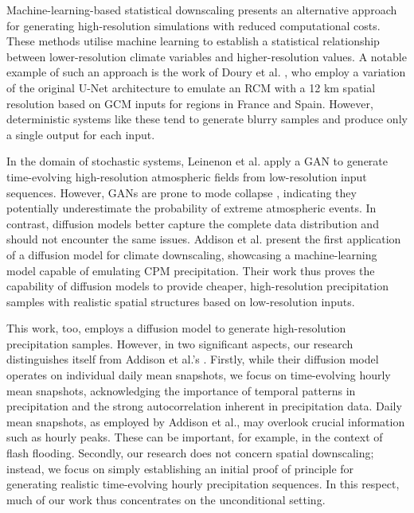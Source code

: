 \documentclass[ oneside,%
                    author={George Herbert},
                    degree={MSci},
                     title={Diffusion Models for Time-Evolving Precipitation Fields},
                  subtitle={}]{dissertation}
\begin{document}
Machine-learning-based statistical downscaling presents an alternative approach for generating high-resolution simulations with reduced computational costs. These methods utilise machine learning to establish a statistical relationship between lower-resolution climate variables and higher-resolution values. A notable example of such an approach is the work of Doury et al. \cite{Doury_Regional_Climate_Model_Emulator}, who employ a variation of the original U-Net architecture \cite{Ronneberger_U-Net} to emulate an RCM with a 12 km spatial resolution based on GCM inputs for regions in France and Spain. However, deterministic systems like these tend to generate blurry samples \cite{Ravuri_Skillful_Precipitation_Nowcasting} and produce only a single output for each input.

In the domain of stochastic systems, Leinenon et al. \cite{Leinonen_Stochastic_Super-Resolution} apply a GAN \cite{Goodfellow_Generative_Adversarial_Networks} to generate time-evolving high-resolution atmospheric fields from low-resolution input sequences. However, GANs are prone to mode collapse \cite{Thanh-Tung_Mode_Collapse}, indicating they potentially underestimate the probability of extreme atmospheric events. In contrast, diffusion models better capture the complete data distribution and should not encounter the same issues. Addison et al. \cite{Addison_Machine_Learning_Emulation} present the first application of a diffusion model for climate downscaling, showcasing a machine-learning model capable of emulating CPM precipitation. Their work thus proves the capability of diffusion models to provide cheaper, high-resolution precipitation samples with realistic spatial structures based on low-resolution inputs.

This work, too, employs a diffusion model to generate high-resolution precipitation samples. However, in two significant aspects, our research distinguishes itself from Addison et al.'s \cite{Addison_Machine_Learning_Emulation}. Firstly, while their diffusion model operates on individual daily mean snapshots, we focus on time-evolving hourly mean snapshots, acknowledging the importance of temporal patterns in precipitation and the strong autocorrelation inherent in precipitation data. Daily mean snapshots, as employed by Addison et al., may overlook crucial information such as hourly peaks. These can be important, for example, in the context of flash flooding. Secondly, our research does not concern spatial downscaling; instead, we focus on simply establishing an initial proof of principle for generating realistic time-evolving hourly precipitation sequences. In this respect, much of our work thus concentrates on the unconditional setting.
\end{document}

